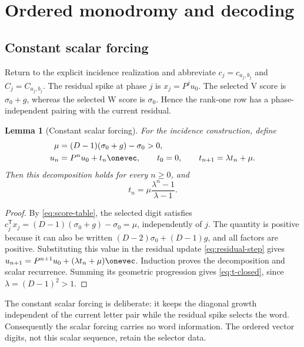 \documentclass[11pt,letterpaper]{article}
\newtheorem{lemma}[theorem]{Lemma}
\theoremstyle{definition}
\theoremstyle{remark}
\numberwithin{equation}{section}
\begin{document}
\section{Ordered monodromy and decoding}

\subsection{Constant scalar forcing}

Return to the explicit incidence realization and abbreviate
\(c_j=c_{a_j,b_j}\) and \(C_j=C_{a_j,b_j}\).  The residual spike at phase
\(j\) is \(x_j=P^ju_0\).  The selected V score is \(\sigma_0+g\), whereas the
selected W score is \(\sigma_0\).  Hence the rank-one row has a phase-independent
pairing with the current residual.

\begin{lemma}[Constant scalar forcing]
\label{lem:scalar-forcing}
For the incidence construction, define
\begin{equation}
 \begin{aligned}
 \mu&=(D-1)(\sigma_0+g)-\sigma_0>0,\\
 u_n&=P^nu_0+t_n\onevec,
 \qquad t_0=0,
 \qquad t_{n+1}=\lambda t_n+\mu.
 \end{aligned}
 \label{eq:scalar-forcing}
\end{equation}
Then this decomposition holds for every \(n\geq0\), and
\begin{equation}
 t_n=\mu\frac{\lambda^n-1}{\lambda-1}.
 \label{eq:t-closed}
\end{equation}
\end{lemma}

\begin{proof}
By \eqref{eq:score-table}, the selected digit satisfies
\(c_j^{\mathsf T}x_j=(D-1)(\sigma_0+g)-\sigma_0=\mu\), independently of \(j\).
The quantity is positive because it can also be written
\((D-2)\sigma_0+(D-1)g\), and all factors are positive.  Substituting this value
in the residual update \eqref{eq:residual-step} gives
\(u_{n+1}=P^{n+1}u_0+(\lambda t_n+\mu)\onevec\).  Induction proves the
decomposition and scalar recurrence.  Summing its geometric progression
gives \eqref{eq:t-closed}, since \(\lambda=(D-1)^2>1\).
\end{proof}

The constant scalar forcing is deliberate: it keeps the diagonal growth
independent of the current letter pair while the residual spike selects the
word.  Consequently the scalar forcing carries no word information.  The
ordered vector digits, not this scalar sequence, retain the selector data.
\end{document}
